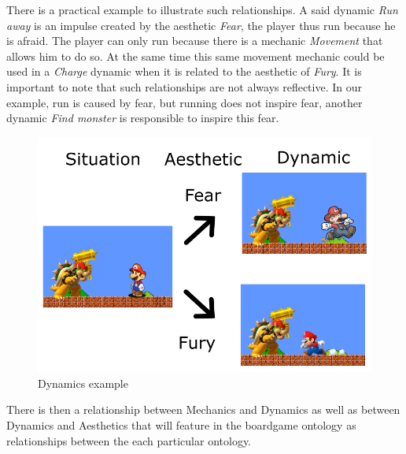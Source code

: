 There is a practical example to illustrate such relationships. A said dynamic \textit{Run away} is an impulse created by the aesthetic \textit{Fear}, the player thus run because he is afraid. The player can only run because there is a mechanic \textit{Movement} that allows him to do so. At the same time this same movement mechanic could be used in a \textit{Charge} dynamic when it is related to the aesthetic of \textit{Fury}. It is important to note that such relationships are not always reflective. In our example, run is caused by fear, but running does not inspire fear, another dynamic \textit{Find monster} is responsible to inspire this fear.
 
 
 \begin{figure}[h!]
     \centering 
     \includegraphics[scale = 0.55]{Images/MarioDiagram_2.png}
     \caption{Dynamics example}
     \label{fig:dynamicexample}
 \end{figure}

There is then a relationship between Mechanics and Dynamics as well as between Dynamics and Aesthetics that will feature in the boardgame ontology as relationships between the each particular ontology.